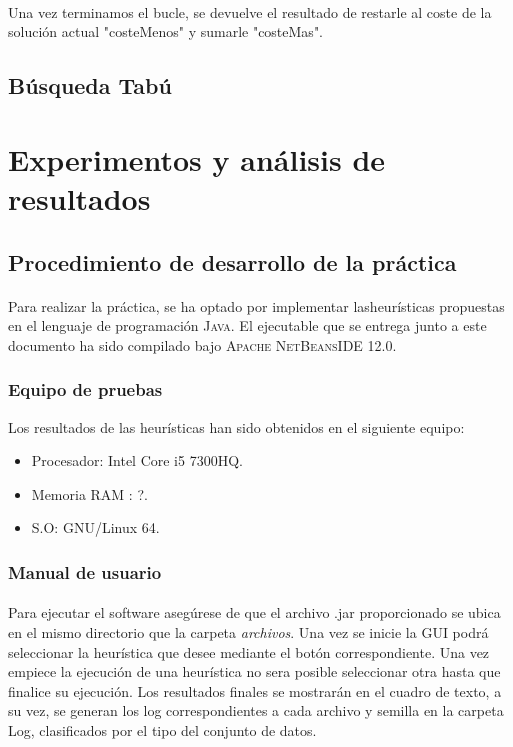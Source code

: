 \documentclass{article}
\begin{document}
	\paragraph{}Una vez terminamos el bucle, se devuelve el resultado de restarle al coste de la solución actual "costeMenos" y sumarle "costeMas".
	
	\subsection{Búsqueda Tabú}
	
	
	\section{Experimentos y análisis de resultados}
	
	\subsection{Procedimiento de desarrollo de la práctica}
	
	\paragraph{}Para realizar la práctica, se ha optado por implementar lasheurísticas propuestas en el lenguaje de programación \textsc{Java}. El ejecutable que se entrega junto a este documento ha sido compilado bajo \textsc{ Apache NetBeansIDE 12.0}.
	
	\subsubsection{Equipo de pruebas}
	
	Los resultados de las heurísticas han sido obtenidos en el siguiente equipo:
	
		\begin{itemize}
			
			\item Procesador: Intel Core i5 7300HQ.
			\item Memoria RAM : ?.
			\item S.O: GNU/Linux 64.
			
		\end{itemize}

	\subsubsection{Manual de usuario}
	
		\paragraph{}Para ejecutar el software asegúrese de que el archivo .jar proporcionado se ubica en el mismo directorio que la carpeta \emph{archivos}. Una vez se inicie la GUI podrá seleccionar la heurística que desee mediante el botón correspondiente. Una vez empiece la ejecución de una heurística no sera posible seleccionar otra hasta que finalice su ejecución. Los resultados finales se mostrarán en el cuadro de texto, a su vez, se generan los log correspondientes a cada archivo y semilla en la carpeta Log, clasificados por el tipo del conjunto de datos.
	
\end{document}
